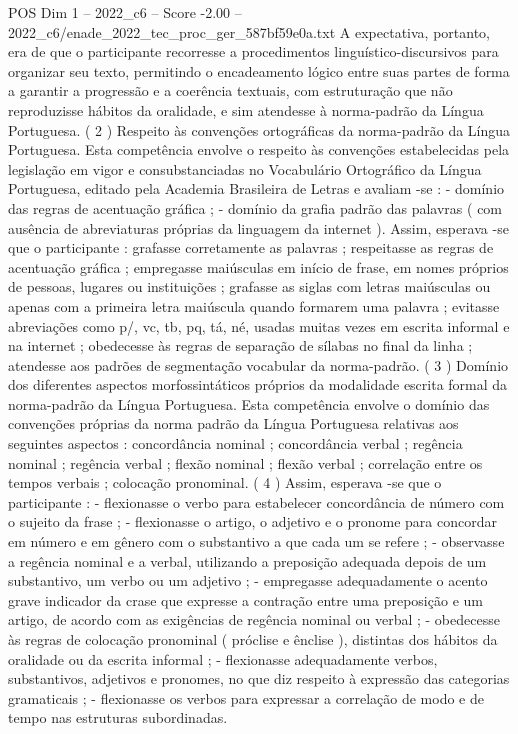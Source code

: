 \begin{textsample}{POS Dim 1 – 2022\_c6 – Score -2.00 – 2022\_c6/enade\_2022\_tec\_proc\_ger\_587bf59e0a.txt}
A expectativa, portanto, era de que o participante recorresse a procedimentos linguístico-discursivos para organizar seu texto, permitindo o encadeamento lógico entre suas partes de forma a garantir a progressão e a coerência textuais, com estruturação que não reproduzisse hábitos da oralidade, e sim atendesse à norma-padrão da Língua Portuguesa. ( 2 ) Respeito às convenções ortográficas da norma-padrão da Língua Portuguesa.
Esta competência envolve o respeito às convenções estabelecidas pela legislação em vigor e consubstanciadas no Vocabulário Ortográfico da Língua Portuguesa, editado pela Academia Brasileira de Letras e avaliam -se : - domínio das regras de acentuação gráfica ; - domínio da grafia padrão das palavras ( com ausência de abreviaturas próprias da linguagem da internet ).
Assim, esperava -se que o participante : grafasse corretamente as palavras ; respeitasse as regras de acentuação gráfica ; empregasse maiúsculas em início de frase, em nomes próprios de pessoas, lugares ou instituições ; grafasse as siglas com letras maiúsculas ou apenas com a primeira letra maiúscula quando formarem uma palavra ; evitasse abreviações como p/, vc, tb, pq, tá, né, usadas muitas vezes em escrita informal e na internet ; obedecesse às regras de separação de sílabas no final da linha ; atendesse aos padrões de segmentação vocabular da norma-padrão. ( 3 ) Domínio dos diferentes aspectos morfossintáticos próprios da modalidade escrita formal da norma-padrão da Língua Portuguesa.
Esta competência envolve o domínio das convenções próprias da norma padrão da Língua Portuguesa relativas aos seguintes aspectos : concordância nominal ; concordância verbal ; regência nominal ; regência verbal ; flexão nominal ; flexão verbal ; correlação entre os tempos verbais ; colocação pronominal. ( 4 ) Assim, esperava -se que o participante : - flexionasse o verbo para estabelecer concordância de número com o sujeito da frase ; - flexionasse o artigo, o adjetivo e o pronome para concordar em número e em gênero com o substantivo a que cada um se refere ; - observasse a regência nominal e a verbal, utilizando a preposição adequada depois de um substantivo, um verbo ou um adjetivo ; - empregasse adequadamente o acento grave indicador da crase que expresse a contração entre uma preposição e um artigo, de acordo com as exigências de regência nominal ou verbal ; - obedecesse às regras de colocação pronominal ( próclise e ênclise ), distintas dos hábitos da oralidade ou da escrita informal ; - flexionasse adequadamente verbos, substantivos, adjetivos e pronomes, no que diz respeito à expressão das categorias gramaticais ; - flexionasse os verbos para expressar a correlação de modo e de tempo nas estruturas subordinadas.

\end{textsample}
